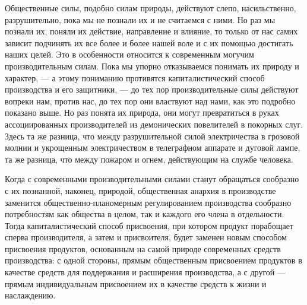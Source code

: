 \documentclass[12pt]{article}
\newcommand{\parnum}{(\arabic{parcount})}
\newcounter{parcount}
\newenvironment{parnumbers}{%
  \par%
  \everypar{\noindent \stepcounter{parcount}\marginpar[]{\parnum}}%
}{}
\begin{document}
\begin{parnumbers}
    Общественные силы, подобно силам природы, действуют слепо, насильственно, разрушительно, пока мы не познали их и не считаемся с ними. Но раз мы познали их, поняли их действие, направление и влияние, то только от нас самих зависит подчинять их все более и более нашей воле и с их помощью достигать наших целей. Это в особенности относится к современным могучим производительным силам. Пока мы упорно отказываемся понимать их природу и характер, — а этому пониманию противятся капиталистический способ производства и его защитники, — до тех пор производительные силы действуют вопреки нам, против нас, до тех пор они властвуют над нами, как это подробно показано выше. Но раз понята их природа, они могут превратиться в руках ассоциированных производителей из демонических повелителей в покорных слуг. Здесь та же разница, что между разрушительной силой электричества в грозовой молнии и укрощенным электричеством в телеграфном аппарате и дуговой лампе, та же разница, что между пожаром и огнем, действующим на службе человека.

    Когда с современными производительными силами станут обращаться сообразно с их познанной, наконец, природой, общественная анархия в производстве заменится общественно-планомерным регулированием производства сообразно потребностям как общества в целом, так и каждого его члена в отдельности. Тогда капиталистический способ присвоения, при котором продукт порабощает сперва производителя, а затем и присвоителя, будет заменен новым способом присвоения продуктов, основанным на самой природе современных средств производства: с одной стороны, прямым общественным присвоением продуктов в качестве средств для поддержания и расширения производства, а с другой — прямым индивидуальным присвоением их в качестве средств к жизни и наслаждению.


\end{parnumbers}
\end{document}
